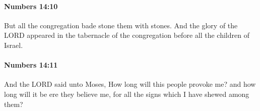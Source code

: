 		\paragraph{Numbers 14:10} %
			\label{NUMBERS-14-10}

			But all the congregation bade stone them with stones. And the glory of the LORD appeared in the tabernacle of the congregation before all the children of Israel.


		\paragraph{Numbers 14:11} %
			\label{NUMBERS-14-11}

			And the LORD said unto Moses, How long will this people provoke me? and how long will it be ere they believe me, for all the signs which I have shewed among them?


